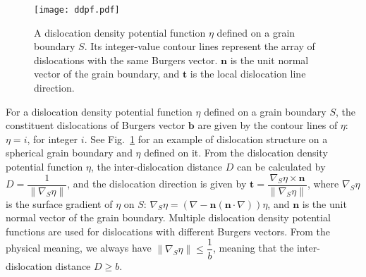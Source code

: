 
\begin{figure}[htbp]
	\centering
	\texttt{[image: ddpf.pdf]}
	\caption{A dislocation density potential function $\eta$ defined on a grain boundary $S$. Its integer-value contour lines  represent the array of dislocations with the same Burgers vector. $\mathbf n$ is the unit normal vector of the grain boundary, and $\mathbf t$ is the local dislocation line direction. }
	\label{fig:dislocation}
\end{figure}


For a dislocation density potential function $\eta$ defined on a grain boundary $S$, the constituent dislocations of Burgers vector $\mathbf b$ are given by the contour lines of $\eta$: $\eta=i$, for integer $i$. See Fig.~\ref{fig:dislocation} for an example of dislocation structure on a spherical grain boundary and $\eta$ defined on it.  From the dislocation density potential function $\eta$, the inter-dislocation distance $D$ can be calculated by
$D=\dfrac{1}{ \| \nabla_S\eta\|}$,
and the dislocation direction is given by
$\mathbf t=\dfrac{\nabla_S\eta \times \mathbf n }{\| \nabla_S\eta\| }$,
where $\nabla_S\eta$ is the surface gradient of $\eta$ on $S$:
$\nabla_S\eta=\left(\nabla-\mathbf n (\mathbf n \cdot \nabla)\right)\eta$, and $\mathbf n$ is the unit normal vector of the grain boundary.
Multiple dislocation density potential functions are used for dislocations with different Burgers vectors. From the physical meaning, we always have $\|\nabla_S \eta\|\leq
\dfrac{1}{b}$, meaning that the inter-dislocation distance $D\geq b$.





